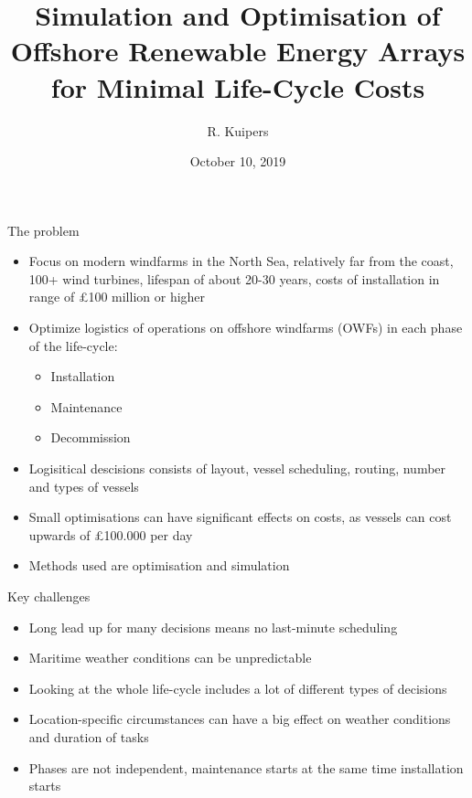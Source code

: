 \documentclass{beamer}
\title[Logistical Optimisation for Offshore Windfarms]{Simulation and Optimisation of Offshore Renewable Energy Arrays for Minimal Life-Cycle Costs}
\author{R. Kuipers}
\date{October 10, 2019}
\begin{document}
\begin{frame}
  \titlepage
\end{frame}

\begin{frame}{The problem}
  \begin{itemize}
  	\item Focus on modern windfarms in the North Sea, relatively far from the coast, 100+ wind turbines, lifespan of about 20-30 years, costs of installation in range of \pounds 100 million or higher
  	\item Optimize logistics of operations on offshore windfarms (OWFs) in each phase of the life-cycle:
  	\begin{itemize}
  		\item Installation
  		\item Maintenance
  		\item Decommission
  	\end{itemize}
  	\item Logisitical descisions consists of layout, vessel scheduling, routing, number and types of vessels
  	\item Small optimisations can have significant effects on costs, as vessels can cost upwards of \pounds 100.000 per day
  	\item Methods used are optimisation and simulation
  \end{itemize}
\end{frame}


\begin{frame}{Key challenges}
  \begin{itemize}
  	\item Long lead up for many decisions means no last-minute scheduling
  	\item Maritime weather conditions can be unpredictable
  	\item Looking at the whole life-cycle includes a lot of different types of decisions
  	\item Location-specific circumstances can have a big effect on weather conditions and duration of tasks
  	\item Phases are not independent, maintenance starts at the same time installation starts
  \end{itemize}
\end{frame}
\end{document}
